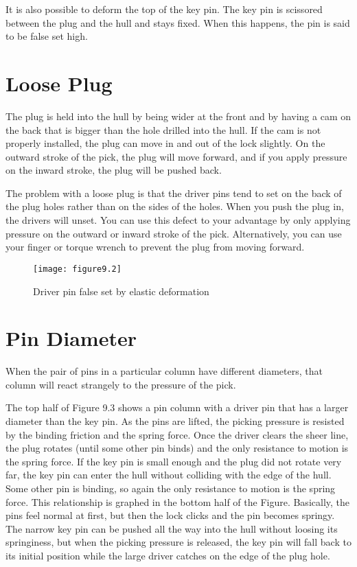 It is also possible to deform the top of the key pin. The key pin is scissored between the
plug and the hull and stays fixed. When this happens, the pin is said to be false set high.

\section{Loose Plug }
The plug is held into the hull by being wider at the front and by having a cam on the back
that is bigger than the hole drilled into the hull. If the cam is not properly installed, the
plug can move in and out of the lock slightly. On the outward stroke of the pick, the plug
will move forward, and if you apply pressure on the inward stroke, the plug will be pushed
back.

The problem with a loose plug is that the driver pins tend to set on the back of the plug
holes rather than on the sides of the holes. When you push the plug in, the drivers will
unset. You can use this defect to your advantage by only applying pressure on the outward
or inward stroke of the pick. Alternatively, you can use your finger or torque wrench to
prevent the plug from moving forward.

\begin{figure}
    \texttt{[image: figure9.2]}
    \caption{Driver pin false set by elastic deformation}
\end{figure}

\section{Pin Diameter}
When the pair of pins in a particular column have different diameters, that column will react
strangely to the pressure of the pick.

The top half of Figure 9.3 shows a pin column with a driver pin that has a larger diameter
than the key pin. As the pins are lifted, the picking pressure is resisted by the binding friction
and the spring force. Once the driver clears the sheer line, the plug rotates (until some other
pin binds) and the only resistance to motion is the spring force. If the key pin is small enough
and the plug did not rotate very far, the key pin can enter the hull without colliding with
the edge of the hull. Some other pin is binding, so again the only resistance to motion is the
spring force. This relationship is graphed in the bottom half of the Figure. Basically, the
pins feel normal at first, but then the lock clicks and the pin becomes springy. The narrow
key pin can be pushed all the way into the hull without loosing its springiness, but when the
picking pressure is released, the key pin will fall back to its initial position while the large
driver catches on the edge of the plug hole.

